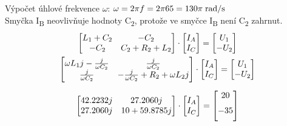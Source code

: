 \documentclass[12pt,a4paper]{article} %
\begin{document}
		Výpočet úhlové frekvence $\omega$:
		\(
		\\ \omega = 2 \pi f = 2 \pi 65 = 130 \pi \; \text{rad/s}
	    \)
	    \medskip
	    \\Smyčka I\textsubscript{B} neovlivňuje hodnoty C\textsubscript{2}, protože ve smyčce I\textsubscript{B} není C\textsubscript{2} zahrnut.
		\bigskip
		\medskip
	\begin{gather*}
	    \begin{bmatrix}
		    L_1 + C_2	& -C_2 \\
			-C_2        & C_2 + R_2 + L_2 \\
		\end{bmatrix}
		\cdot
		\begin{bmatrix}
			I_A \\
			I_C \\
		\end{bmatrix}
		=
		\begin{bmatrix}
			U_1 \\
		    -U_2 \\
		\end{bmatrix}
		\\
		\medskip
		\begin{bmatrix}
			\omega L_1j - \frac{j}{\omega C_2}	& \frac{j}{\omega C_2} \\
			\frac{j}{\omega C_2} & -\frac{j}{\omega C_2} + R_2 + \omega L_2j \\
		\end{bmatrix}
		\cdot
		\begin{bmatrix}
			I_A \\
			I_C \\
		\end{bmatrix}
		=
		\begin{bmatrix}
			U_1 \\
		    -U_2 \\
		\end{bmatrix}
		\\
		\begin{bmatrix}
		    42.2232j & 27.2060j\\
			27.2060j & 10 + 59.8785j \\
		\end{bmatrix}
		\cdot
		\begin{bmatrix}
			I_A \\
			I_C \\
		\end{bmatrix}
		=
		\begin{bmatrix}
			\medskip
			20 \\
			\medskip
			-35 \\
		\end{bmatrix}
	\end{gather*}
\end{document}

